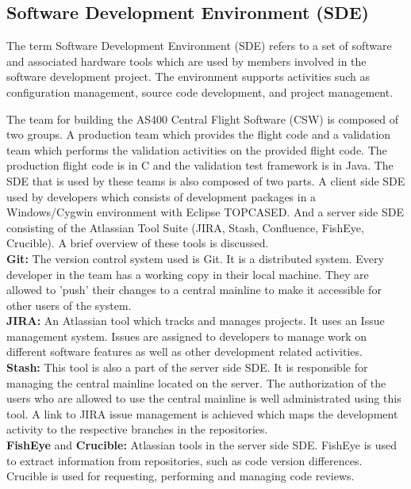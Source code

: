 \documentclass[12pt, a4paper, titlepage]{scrartcl}
\begin{document}
\subsection{Software Development Environment (SDE)}
\par The term Software Development Environment (SDE) refers to a set of software and associated hardware tools which are used by members involved in the software development project. The environment supports activities such as configuration management, source code development, and project management\cite{dart1992overview}. 
\par The team for building the AS400 Central Flight Software (CSW) is composed of two groups. A production team which provides the flight code and a validation team which performs the validation activities on the provided flight code. The production flight code is in C and the validation test framework is in Java. The SDE that is used by these teams is also composed of two parts. A client side SDE used by developers which consists of development packages in a Windows/Cygwin environment with Eclipse TOPCASED.  And a server side SDE consisting of the Atlassian Tool Suite (JIRA, Stash, Confluence, FishEye, Crucible). A brief overview of these tools is discussed.\\
\textbf{Git:} The version control system used is Git\cite{GitflowWorkflow}. It is a distributed system. Every developer in the team has a working copy in their local machine. They are allowed to 'push' their changes to a central mainline to make it accessible for other users of the system.\\
\textbf{JIRA:} An Atlassian tool which tracks and manages projects\cite{fisher2013utilizing}. It uses an Issue management system. Issues\cite{jiraIssue} are assigned to developers to manage work on different software features as well as other development related activities. \\
\textbf{Stash:} This tool is also a part of the server side SDE. It is responsible for managing the central mainline located on the server. The authorization of the users who are allowed to use the central mainline is well administrated using this tool. A link to JIRA issue management is achieved which maps the development activity to the respective branches in the repositories.\\
\textbf{FishEye }and \textbf{Crucible:} Atlassian tools in the server side SDE. FishEye is used to extract information from repositories, such as code version differences. Crucible is used for requesting, performing and managing code reviews\cite{bacchelli2013expectations}.\\ 
\end{document}

